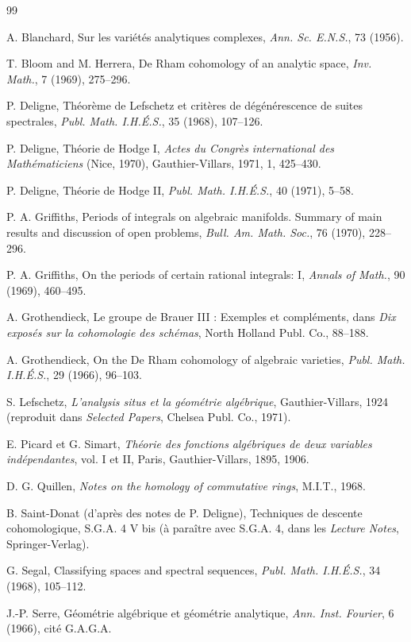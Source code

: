 \documentclass[11pt]{amsart}
\theoremstyle{plain}
\theoremstyle{definition}
\begin{document}
\begin{thebibliography}{99}

 A. Blanchard, Sur les vari\'et\'es analytiques complexes, \emph{Ann. Sc. E.N.S.}, 73 (1956).

 T. Bloom and M. Herrera, De Rham cohomology of an analytic space, \emph{Inv. Math.}, 7 (1969), 275--296.

 P. Deligne, Th\'eor\`eme de Lefschetz et crit\`eres de d\'eg\'en\'erescence de suites spectrales, \emph{Publ. Math. I.H.\'E.S.}, 35 (1968), 107--126.

 P. Deligne, Th\'eorie de Hodge I, \emph{Actes du Congr\`es international des Math\'ematiciens} (Nice, 1970), Gauthier-Villars, 1971, 1, 425--430.

 P. Deligne, Th\'eorie de Hodge II, \emph{Publ. Math. I.H.\'E.S.}, 40 (1971), 5--58.

 P. A. Griffiths, Periods of integrals on algebraic manifolds. Summary of main results and discussion of open problems, \emph{Bull. Am. Math. Soc.}, 76 (1970), 228--296.

 P. A. Griffiths, On the periods of certain rational integrals: I, \emph{Annals of Math.}, 90 (1969), 460--495.

 A. Grothendieck, Le groupe de Brauer III : Exemples et compl\'ements, dans \emph{Dix expos\'es sur la cohomologie des sch\'emas}, North Holland Publ. Co., 88--188.

 A. Grothendieck, On the De Rham cohomology of algebraic varieties, \emph{Publ. Math. I.H.\'E.S.}, 29 (1966), 96--103.

 S. Lefschetz, \emph{L'analysis situs et la g\'eom\'etrie alg\'ebrique}, Gauthier-Villars, 1924 (reproduit dans \emph{Selected Papers}, Chelsea Publ. Co., 1971).

 E. Picard et G. Simart, \emph{Th\'eorie des fonctions alg\'ebriques de deux variables ind\'ependantes}, vol. I et II, Paris, Gauthier-Villars, 1895, 1906.

 D. G. Quillen, \emph{Notes on the homology of commutative rings}, M.I.T., 1968.

 B. Saint-Donat (d'apr\`es des notes de P. Deligne), Techniques de descente cohomologique, S.G.A. 4 V bis (\`a para\^itre avec S.G.A. 4, dans les \emph{Lecture Notes}, Springer-Verlag).

 G. Segal, Classifying spaces and spectral sequences, \emph{Publ. Math. I.H.\'E.S.}, 34 (1968), 105--112.

 J.-P. Serre, G\'eom\'etrie alg\'ebrique et g\'eom\'etrie analytique, \emph{Ann. Inst. Fourier}, 6 (1966), cit\'e G.A.G.A.

\end{thebibliography}
\end{document}
